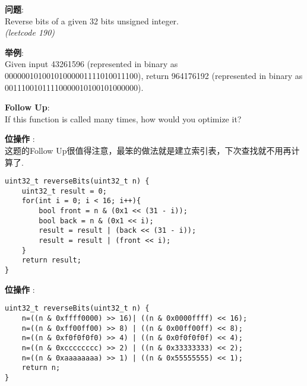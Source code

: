     
\begin{description}
    \item{\textbf{问题}}:\\
Reverse bits of a given 32 bits unsigned integer.\\
\textit{(leetcode 190)}
    \item{\textbf{举例}}:\\
Given input 43261596 (represented in binary as 00000010100101000001111010011100), return 964176192 (represented in binary as 00111001011110000010100101000000).
	\item{\textbf{Follow Up}}:\\
If this function is called many times, how would you optimize it?
    \item{\textbf{位操作}} : 
    \\这题的Follow Up很值得注意，最笨的做法就是建立索引表，下次查找就不用再计算了.
    \begin{lstlisting}
uint32_t reverseBits(uint32_t n) {
	uint32_t result = 0;
	for(int i = 0; i < 16; i++){
		bool front = n & (0x1 << (31 - i));
		bool back = n & (0x1 << i);
		result = result | (back << (31 - i));
		result = result | (front << i);
	}
	return result;
}
    \end{lstlisting}
    \item{\textbf{位操作}} : 
    \begin{lstlisting}
uint32_t reverseBits(uint32_t n) {
	n=((n & 0xffff0000) >> 16)| ((n & 0x0000ffff) << 16);
	n=((n & 0xff00ff00) >> 8) | ((n & 0x00ff00ff) << 8);
	n=((n & 0xf0f0f0f0) >> 4) | ((n & 0x0f0f0f0f) << 4);
	n=((n & 0xcccccccc) >> 2) | ((n & 0x33333333) << 2);
	n=((n & 0xaaaaaaaa) >> 1) | ((n & 0x55555555) << 1);
	return n;
}
    \end{lstlisting}
\end{description}

